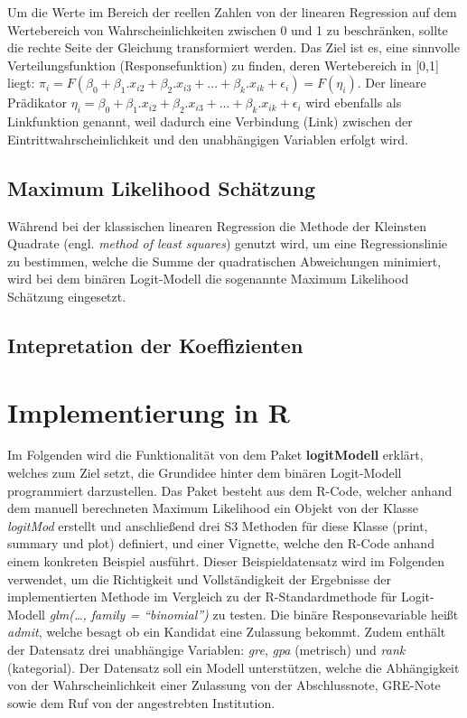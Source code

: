 \documentclass[12pt,]{article}
\begin{document}
Um die Werte im Bereich der reellen Zahlen von der linearen Regression
auf dem Wertebereich von Wahrscheinlichkeiten zwischen 0 und 1 zu
beschränken, sollte die rechte Seite der Gleichung transformiert werden.
Das Ziel ist es, eine sinnvolle Verteilungsfunktion (Responsefunktion)
zu finden, deren Wertebereich in {[}0,1{]} liegt:
\(\pi_i = F(\beta_0 + \beta_1.x_{i2} + \beta_2.x_{i3} + ... + \beta_k.x_{ik} + \epsilon_i) = F(\eta_i)\).
Der lineare Prädikator
\(\eta_i = \beta_0 + \beta_1.x_{i2} + \beta_2.x_{i3} + ... + \beta_k.x_{ik} + \epsilon_i\)
wird ebenfalls als Linkfunktion genannt, weil dadurch eine Verbindung
(Link) zwischen der Eintrittwahrscheinlichkeit und den unabhängigen
Variablen erfolgt wird.

\subsection{Maximum Likelihood
Schätzung}\label{maximum-likelihood-schatzung}

Während bei der klassischen linearen Regression die Methode der
Kleinsten Quadrate (engl. \emph{method of least squares}) genutzt wird,
um eine Regressionslinie zu bestimmen, welche die Summe der
quadratischen Abweichungen minimiert, wird bei dem binären Logit-Modell
die sogenannte Maximum Likelihood Schätzung eingesetzt.

\subsection{Intepretation der
Koeffizienten}\label{intepretation-der-koeffizienten}

\section{Implementierung in R}\label{implementierung-in-r}

Im Folgenden wird die Funktionalität von dem Paket \textbf{logitModell}
erklärt, welches zum Ziel setzt, die Grundidee hinter dem binären
Logit-Modell programmiert darzustellen. Das Paket besteht aus dem
R-Code, welcher anhand dem manuell berechneten Maximum Likelihood ein
Objekt von der Klasse \emph{logitMod} erstellt und anschließend drei S3
Methoden für diese Klasse (print, summary und plot) definiert, und einer
Vignette, welche den R-Code anhand einem konkreten Beispiel ausführt.
Dieser Beispieldatensatz wird im Folgenden verwendet, um die Richtigkeit
und Vollständigkeit der Ergebnisse der implementierten Methode im
Vergleich zu der R-Standardmethode für Logit-Modell \emph{glm(\ldots{},
family = ``binomial'')} zu testen. Die binäre Responsevariable heißt
\emph{admit}, welche besagt ob ein Kandidat eine Zulassung bekommt.
Zudem enthält der Datensatz drei unabhängige Variablen: \emph{gre},
\emph{gpa} (metrisch) und \emph{rank} (kategorial). Der Datensatz soll
ein Modell unterstützen, welche die Abhängigkeit von der
Wahrscheinlichkeit einer Zulassung von der Abschlussnote, GRE-Note sowie
dem Ruf von der angestrebten Institution.
\end{document}
